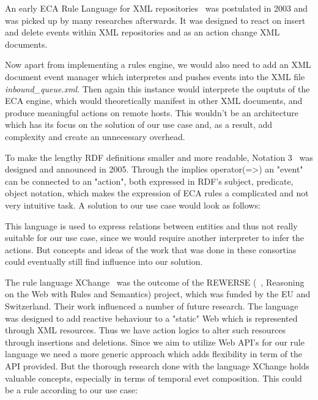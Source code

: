 
An early ECA Rule Language for XML repositories~\cite{Papamarkos03event-condition-actionrule} was postulated in 2003 and was picked up by many researches afterwards. It was designed to react on insert and delete events within XML repositories and as an action change XML documents.


Now apart from implementing a rules engine, we would also need to add an XML document event manager which interpretes and pushes events into the XML file \emph{inbound\_queue.xml}. Then again this instance would interprete the ouptuts of the ECA engine, which would theoretically manifest in other XML documents, and produce meaningful actions on remote hosts. This wouldn't be an architecture which has its focus on the solution of our use case and, as a result, add complexity and create an unnecessary overhead.

To make the lengthy RDF definitions smaller and more readable, Notation 3~\cite{berners2006notation} was designed and announced in 2005. Through the implies operator(=\textgreater) an "event" can be connected to an "action", both expressed in RDF's subject, predicate, object notation, which makes the expression of ECA rules a complicated and not very intuitive task. A solution to our use case would look as follows:

This language is used to express relations between entities and thus not really suitable for our use case, since we would require another interpreter to infer the actions. But concepts and ideas of the work that was done in these consortias could eventually still find influence into our solution.

The rule language XChange~\cite{2005-Patranjan-TLE.pdf} was the outcome of the REWERSE (~\cite{wwwRewerse}, Reasoning on the Web with Rules and Semantics) project, which was funded by the EU and Switzerland. Their work influenced a number of future research. The language was designed to add reactive behaviour to a "static" Web which is represented through XML resources. Thus we have action logics to alter such resources through insertions and deletions. Since we aim to utilize Web API's for our rule language we need a more generic approach which adds flexibility in term of the API provided. But the thorough research done with the language XChange holds valuable concepts, especially in terms of temporal evet composition. This could be a rule according to our use case:


